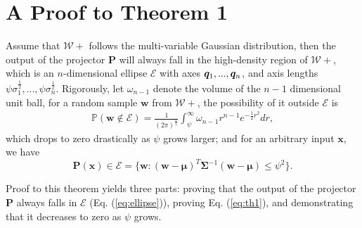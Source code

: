 \documentclass[10pt,twocolumn,letterpaper]{article}
\newcommand{\w}{\bm{w}}
\begin{document}
{\small


}


\newcommand{\beginsupplementary}{\setcounter{equation}{0}
        \renewcommand{\theequation}{S\arabic{equation}}\setcounter{table}{0}
        \renewcommand{\thetable}{S\arabic{table}}\setcounter{figure}{0}
        \renewcommand{\thefigure}{S\arabic{figure}}}
     
\renewcommand{\contentsname}{\centering Appendix}








\appendix
\beginsupplementary


\onecolumn

\section*{A Proof to Theorem 1}

\begin{theorem}
Assume that $\mathcal{W}+$ follows the multi-variable Gaussian distribution, then the output of the projector $\bm{P}$ will always fall in the high-density region of $\mathcal{W}+$, which is an $n$-dimensional ellipse $\mathcal{E}$ with axes $\bm{q}_1,...,\bm{q}_n$, and axis lengths $\psi \sigma_1^{\frac{1}{2}},...,\psi \sigma_n^{\frac{1}{2}}$. Rigorously, let $\omega_{n-1}$ denote the volume of the $n-1$ dimensional unit ball, for a random sample $\w$ from $\mathcal{W}+$, the possibility of it outside $\mathcal{E}$ is
\begin{equation}\label{eq:th1}
\begin{aligned}
    \mathbb{P}(\w \notin \mathcal{E})
    =\frac{1}{(2\pi)^{\frac{n}{2}}}\int_{\psi}^{\infty}\omega_{n-1}r^{n-1}e^{-\frac{1}{2}r^2}dr,
\end{aligned}
\end{equation}
which drops to zero drastically as $\psi$ grows larger; and for an arbitrary input $\bm{x}$, we have
\begin{equation}\label{eq:ellipse}
    \bm{P}(\bm{x})\in\mathcal{E}=\{\w:(\w-\bm{\mu})^T\bm{\Sigma}^{-1}(\w-\bm{\mu})\leq\psi^2\}.
\end{equation}
\end{theorem}
\newtheorem{remark}{Remark}




Proof to this theorem yields three parts: proving that the output of the projector $\bm{P}$ always falls in $\mathcal{E}$ (Eq. (\ref{eq:ellipse})), proving Eq. (\ref{eq:th1}), and demonstrating that it decreases to zero as $\psi$ grows.
\end{document}

